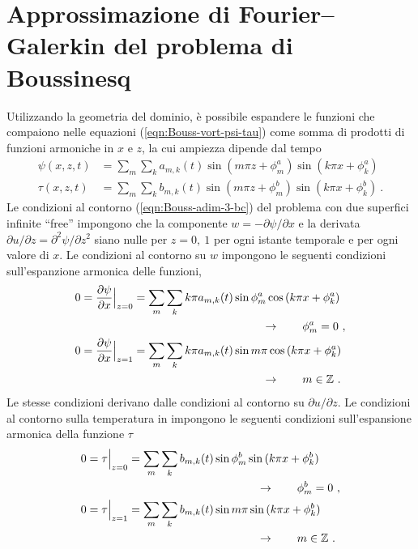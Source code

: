 \documentclass{article}
\begin{document}
\section{Approssimazione di Fourier--Galerkin del problema di Boussinesq}
Utilizzando la geometria del dominio, è possibile espandere le funzioni che compaiono nelle equazioni (\ref{eqn:Bouss-vort-psi-tau}) come somma di prodotti di funzioni armoniche in $x$ e $z$, la cui ampiezza dipende dal tempo
\begin{equation}\label{eqn:harm-1}
\begin{aligned}
    \psi(x,z,t) & = \sum_m \sum_k a_{m,k}(t) \sin{(m\pi z + \phi^a_m)}\sin{(k\pi x + \phi^a_k)} \\
    \tau(x,z,t) & = \sum_m \sum_k b_{m,k}(t) \sin{(m\pi z + \phi^b_m)}\sin{(k\pi x + \phi^b_k)} \ .
\end{aligned}
\end{equation}
Le condizioni al contorno (\ref{eqn:Bouss-adim-3-bc}) del problema con due superfici infinite ``free'' impongono che la componente $w=-\partial{\psi}/\partial{x}$ e la derivata $\partial u/\partial z = \partial^2 \psi/\partial z^2$ siano nulle per $z = 0, \ 1$ per ogni istante temporale e per ogni valore di $x$. Le condizioni al contorno su $w$ impongono le seguenti condizioni sull'espanzione armonica delle funzioni,
\begin{equation}
    \begin{aligned}
      0 = \dfrac{\partial \psi}{\partial x}\Big|_{z=0} & = \sum_m \sum_k k \pi a_{m,k}(t) \sin{ \phi^a_m }\cos{(k\pi x + \phi^a_k)} \\
      & \hspace{4.0cm} \rightarrow \qquad \phi^a_m = 0 \ , \\
      0 = \dfrac{\partial \psi}{\partial x}\Big|_{z=1} & = \sum_m \sum_k k \pi a_{m,k}(t) \sin{ m \pi }\cos{(k\pi x + \phi^a_k)} \\
      & \hspace{4.0cm} \rightarrow \qquad m \in \mathbb{Z} \ .
    \end{aligned}
\end{equation}
Le stesse condizioni derivano dalle condizioni al contorno su $\partial u/\partial z$.
%
Le condizioni al contorno sulla temperatura in impongono le seguenti condizioni sull'espansione armonica della funzione $\tau$
\begin{equation}
    \begin{aligned}
      0 = \tau \Big|_{z=0} & = \sum_m \sum_k b_{m,k}(t) \sin{ \phi^b_m }\sin{(k\pi x + \phi^b_k)} \\
      & \hspace{4.0cm} \rightarrow \qquad \phi^b_m = 0 \ ,\\
      0 = \tau \Big|_{z=1} & = \sum_m \sum_k b_{m,k}(t) \sin{ m \pi }\sin{(k\pi x + \phi^b_k)} \\
      & \hspace{4.0cm} \rightarrow \qquad m \in \mathbb{Z} \ .
    \end{aligned}
\end{equation}
\end{document}
